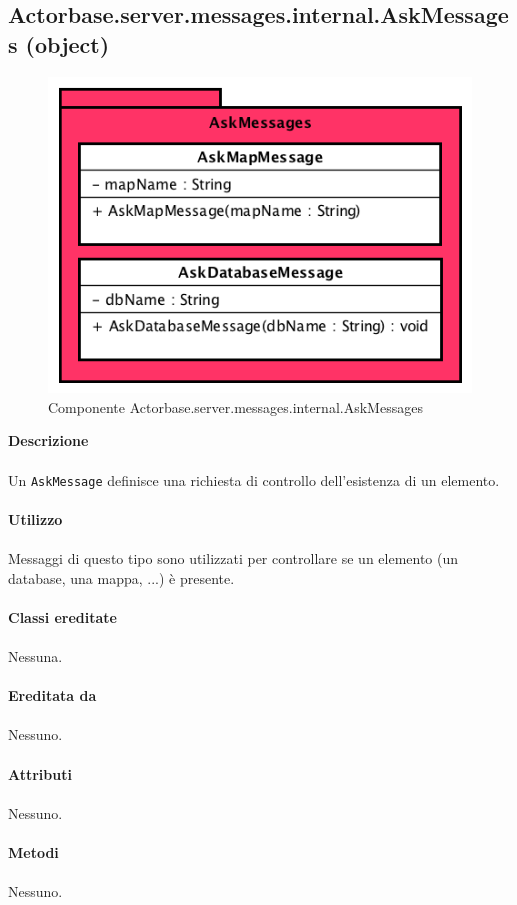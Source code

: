 \documentclass[a4paper]{article}
\begin{document}
	\subsection{Actorbase.server.messages.internal.AskMessages (object)}
			\begin{figure}[H]
			\centering
			\includegraphics[scale = 0.5]{Server/AskMessages.png}
			\caption{Componente Actorbase.server.messages.internal.AskMessages}
		\end{figure}
		\textbf{Descrizione}
			\\ \\
			Un \texttt{AskMessage} definisce una richiesta di controllo dell'esistenza di un elemento.
			\\ \\
		\textbf{Utilizzo}
			\\ \\
			Messaggi di questo tipo sono utilizzati per controllare se un elemento (un database, una mappa, ...) è presente.
			\\ \\
		\textbf{Classi ereditate}
			\\ \\
			Nessuna.
			\\ \\
		\textbf{Ereditata da}
			\\ \\
			Nessuno.
			\\ \\
		\textbf{Attributi}
			\\ \\
			Nessuno.
			\\ \\
		\textbf{Metodi}
			\\ \\
			Nessuno.		
		
\end{document}
